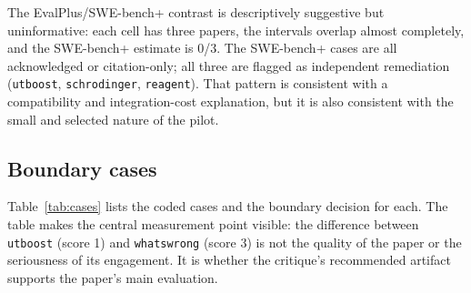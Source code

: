 \documentclass[11pt,a4paper]{article}
\newcommand{\key}[1]{\texttt{\small #1}}
\begin{document}
The EvalPlus/SWE-bench+ contrast is descriptively suggestive but uninformative: each cell has three papers, the intervals overlap almost completely, and the SWE-bench+ estimate is 0/3. The SWE-bench+ cases are all acknowledged or citation-only; all three are flagged as independent remediation (\key{utboost}, \key{schrodinger}, \key{reagent}). That pattern is consistent with a compatibility and integration-cost explanation, but it is also consistent with the small and selected nature of the pilot.

\subsection{Boundary cases}

Table~\ref{tab:cases} lists the coded cases and the boundary decision for each. The table makes the central measurement point visible: the difference between \key{utboost} (score 1) and \key{whatswrong} (score 3) is not the quality of the paper or the seriousness of its engagement. It is whether the critique's recommended artifact supports the paper's main evaluation.
\end{document}
